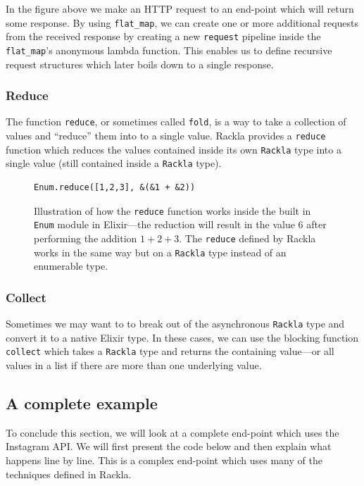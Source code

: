 \documentclass{cslthse-msc}
\begin{document}
In the figure above we make an HTTP request to an end-point which will return some response. By using \lstinline{flat_map}, we can create one or more additional requests from the received response by creating a new \lstinline{request} pipeline inside the \lstinline{flat_map}'s anonymous lambda function. This enables us to define recursive request structures which later boils down to a single response.

\subsubsection{Reduce}
The function \lstinline{reduce}, or sometimes called \lstinline{fold}, is a way to take a collection of values and \enquote{reduce} them into to a single value. Rackla provides a \lstinline{reduce} function which reduces the values contained inside its own \lstinline{Rackla} type into a single value (still contained inside a \lstinline{Rackla} type).

\begin{figure}[H]
  \centering
\begin{lstlisting}[breaklines=true,frame=single]
Enum.reduce([1,2,3], &(&1 + &2))
\end{lstlisting}
  \caption{Illustration of how the \lstinline{reduce} function works inside the built in \lstinline{Enum} module in Elixir---the reduction will result in the value $6$ after performing the addition $1+2+3$. The \lstinline{reduce} defined by Rackla works in the same way but on a \lstinline{Rackla} type instead of an enumerable type.}
\end{figure}

\subsubsection{Collect}
Sometimes we may want to to break out of the asynchronous \lstinline{Rackla} type and convert it to a native Elixir type. In these cases, we can use the blocking function \lstinline{collect} which takes a \lstinline{Rackla} type and returns the containing value---or all values in a list if there are more than one underlying value.

\clearpage

\pagebreak

\subsection{A complete example}
To conclude this section, we will look at a complete end-point which uses the Instagram API\cite{instagram_api}. We will first present the code below and then explain what happens line by line. This is a complex end-point which uses many of the techniques defined in Rackla.
\end{document}
